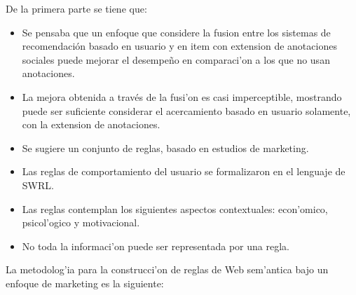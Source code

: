 \documentclass[11pt]{article}
\begin{document}
De la primera parte se tiene que:
\begin{itemize}
\item Se pensaba que un enfoque que considere la fusion entre los sistemas de recomendación basado en usuario y en item con extension de anotaciones sociales puede mejorar el desempeño en comparaci'on a los que no usan anotaciones.
\item La mejora obtenida a través de la fusi'on es casi imperceptible, mostrando puede ser suficiente considerar el acercamiento basado en usuario solamente, con la extension de anotaciones.
\item Se sugiere un conjunto de reglas, basado en estudios de marketing.
\item Las reglas de comportamiento del usuario se formalizaron en el lenguaje de SWRL.
\item Las reglas contemplan los siguientes aspectos contextuales: econ'omico, psicol'ogico y motivacional.
\item No toda la informaci'on puede ser representada por una regla.
\end{itemize}

La metodolog'ia para la construcci'on de reglas de Web sem'antica bajo un enfoque de marketing es la siguiente:
\end{document}
